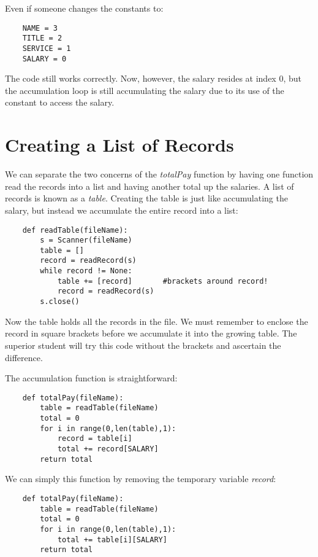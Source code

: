 Even if someone changes the constants to:

\begin{verbatim}
    NAME = 3
    TITLE = 2
    SERVICE = 1
    SALARY = 0
\end{verbatim}

The code still works correctly. Now, however, the salary resides
at index 0, but the accumulation loop is still accumulating the
salary due to its use of the constant to access the salary.

\section{Creating a List of Records}

We can separate the two concerns of the {\it totalPay} function
by having one function read the records into a list
and having another total up the salaries.
A list of
records is known as a {\it table}.
Creating the table
is just like accumulating the salary, but instead
we accumulate the entire record into a list:

\begin{verbatim}
    def readTable(fileName):
        s = Scanner(fileName)
        table = []
        record = readRecord(s)
        while record != None:
            table += [record]       #brackets around record!
            record = readRecord(s)
        s.close()            
\end{verbatim}

Now the table holds all the records in the file.
We must remember to enclose the record in square brackets 
before we accumulate it into the growing table. The
superior student will try this code without the brackets
and ascertain the difference.

The accumulation function is straightforward:

\begin{verbatim}
    def totalPay(fileName):
        table = readTable(fileName)
        total = 0
        for i in range(0,len(table),1):
            record = table[i]
            total += record[SALARY]
        return total
\end{verbatim}

We can simply this function by removing the temporary variable
{\it record}:

\begin{verbatim}
    def totalPay(fileName):
        table = readTable(fileName)
        total = 0
        for i in range(0,len(table),1):
            total += table[i][SALARY]
        return total
\end{verbatim}

